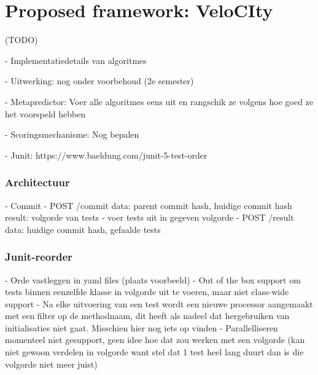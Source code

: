 \chapter{Proposed framework: VeloCIty}
(TODO)

- Implementatiedetails van algoritmes

- Uitwerking: nog onder voorbehoud (2e semester)

- Metapredictor: Voer alle algoritmes eens uit en rangschik ze volgens hoe goed ze het voorspeld hebben

- Scoringsmechanisme: Nog bepalen

- Junit: https://www.baeldung.com/junit-5-test-order

\subsection{Architectuur}
- Commit
- POST /commit
	data: parent commit hash, huidige commit hash
	result: volgorde van tests
- voer tests uit in gegeven volgorde
- POST /result
	data: huidige commit hash, gefaalde tests
	
\subsection{Junit-reorder}
- Orde vastleggen in yaml files (plaats voorbeeld)
- Out of the box support om tests binnen eenzelfde klasse in volgorde uit te voeren, maar niet class-wide support
- Na elke uitvoering van een test wordt een nieuwe processor aangemaakt met een filter op de methodnaam, dit heeft als nadeel dat hergebruiken van initialisaties niet gaat. Misschien hier nog iets op vinden
- Parallelliseren momenteel niet gesupport, geen idee hoe dat zou werken met een volgorde (kan niet gewoon verdelen in volgorde want stel dat 1 test heel lang duurt dan is die volgorde niet meer juist)
